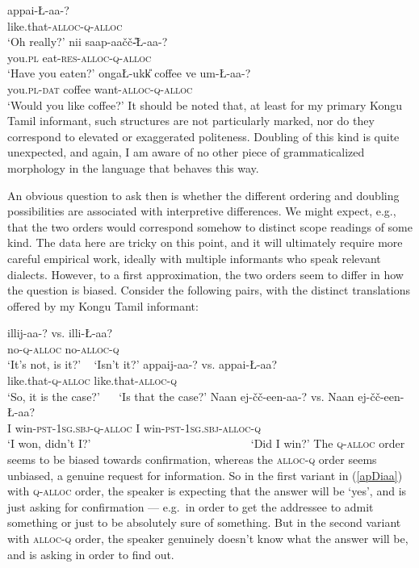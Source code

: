 \documentclass[output=paper, modfonts, nonflat]{langsci/langscibook}
\begin{document}
\ea\label{double}
 \ea\label{apdidouble}\gll appa\D i-\nga\L-aa-\nga?\\
 like.that-\textsc{alloc}-\textsc{q}-\textsc{alloc}\\
 \glt `Oh really?'
 \ex\label{saapdouble}\gll nii\nga{} saap\textrtailt-aa\v{c}\v{c}\U-\nga\L-aa-\nga?\\
 you.\textsc{pl} eat-\textsc{res}-\textsc{alloc}-\textsc{q}-\textsc{alloc}\\
 \glt `Have you eaten?'
 \ex\label{coffeedouble}\gll onga\L-ukk\U{} coffee ve\textrtailn
 um-\nga\L-aa-\nga?\\
 you.\textsc{pl}-\textsc{dat}{} coffee want-\textsc{alloc}-\textsc{q}-\textsc{alloc}\\
 \glt `Would you like coffee?'
 \z
\z
%
It should be noted that, at least for my primary Kongu Tamil
informant, such structures are not particularly marked, nor do they
correspond to elevated or exaggerated politeness.  Doubling of this
kind is quite unexpected, and again, I am aware of no other piece of
grammaticalized morphology in the language that behaves this
way.

An obvious question to ask then is whether the different ordering and
doubling possibilities are associated with interpretive
differences. We might expect, e.g., that the two orders would
correspond somehow to distinct scope readings of some kind. The data
here are tricky on this point, and it will ultimately require more
careful empirical work, ideally with multiple informants who speak
relevant dialects. However, to a first approximation, the two orders
seem to differ in how the question is biased. Consider the following
pairs, with the distinct translations offered by my Kongu Tamil
informant:

\ea
 \ea\gll illij-aa-\nga? {vs.} illi-\nga\L-aa?\\
 no-\textsc{q}-\textsc{alloc}{} {} no-\textsc{alloc}-\textsc{q}\\
 \glt `It's not, is it?' ~ `Isn't it?'
 \ex\gll appa\D ij-aa-\nga? {vs.} appa\D i-\nga\L-aa?\label{apDiaa}\\
 like.that-\textsc{q}-\textsc{alloc}{} {} like.that-\textsc{alloc}-\textsc{q}\\
 \glt `So, it is the case?' ~~ `Is that the case?'
 \ex\gll Naan \J ej-\v{c}\v{c}-een-aa-\nga? {vs.} Naan \J
 ej-\v{c}\v{c}-een-\nga\L-aa?\\
 I win-\textsc{pst}-1\textsc{sg}.\textsc{sbj}-\textsc{q}-\textsc{alloc}{} {} I win-\textsc{pst}-1\textsc{sg}.\textsc{sbj}-\textsc{alloc}-\textsc{q}\\
 \glt `I won, didn't I?' ~~~~~~~~~~~~~~~~~~~~~~~~~~~ `Did I win?'
 \z
\z
%
The \textsc{q}-\textsc{alloc}{} order seems to be biased towards confirmation,
whereas the \textsc{alloc}{}-\textsc{q} order seems unbiased, a genuine
request for information. So in the first variant in (\ref{apDiaa})
with \textsc{q}-\textsc{alloc}{} order, the speaker is expecting that the
answer will be `yes', and is just asking for confirmation --- e.g.\ in
order to get the addressee to admit something or just to be absolutely
sure of something. But in the second variant with \textsc{alloc}{}-\textsc{q}
order, the speaker genuinely doesn't know what the answer will be, and
is asking in order to find out. 
\end{document}
